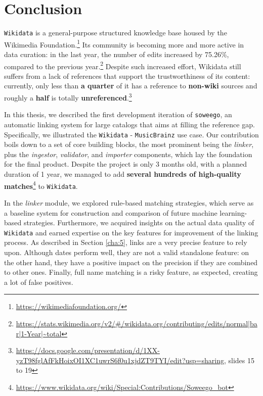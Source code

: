 \chapter{Conclusion}
\label{cha:conclusioni}
\texttt{Wikidata} is a general-purpose structured knowledge base housed by the Wikimedia Foundation.\footnote{\url{https://wikimediafoundation.org/}}
Its community is becoming more and more active in data curation: in the last year, the number of edits increased by 75.26\%, compared to the previous year.\footnote{\url{https://stats.wikimedia.org/v2/\#/wikidata.org/contributing/edits/normal|bar|1-Year|~total}} Despite such increased effort, Wikidata still suffers from a lack of references that support the trustworthiness of its content: currently, only less than \textbf{a quarter} of it has a reference to \textbf{non-wiki} sources and roughly a \textbf{half} is totally \textbf{unreferenced}.\footnote{\url{https://docs.google.com/presentation/d/1XX-yzT98fglAfFkHoixOI1XC1uwrS6f0u1xjdZT9TYI/edit?usp=sharing}, slides 15 to 19}

In this thesis, we described the first development iteration of \texttt{soweego}, an automatic linking system for large catalogs that aims at filling the reference gap.
Specifically, we illustrated the  \texttt{Wikidata} - \texttt{MusicBrainz} use case.
Our contribution boils down to a set of core building blocks, the most prominent being the \textit{linker}, plus the \textit{ingestor}, \textit{validator}, and \textit{importer} components, which lay the foundation for the final product.
Despite the project is only 3 months old, with a planned duration of 1 year, we managed to add \textbf{several hundreds of high-quality matches}\footnote{\url{https://www.wikidata.org/wiki/Special:Contributions/Soweego_bot}} to \texttt{Wikidata}.

In the \textit{linker} module, we explored rule-based matching strategies, which serve as a baseline system for construction and comparison  of future machine learning-based strategies.
Furthermore, we acquired insights on the actual data quality of \texttt{Wikidata} and earned expertise on the key features for improvement of the linking process.
As described in Section \ref{cha:5}, links are a very precise feature to rely upon. Although dates perform well, they are not a valid standalone feature: on the other hand, they have a positive impact on the precision if they are combined to other ones.
Finally, full name matching is a risky feature, as expected, creating a lot of false positives.


